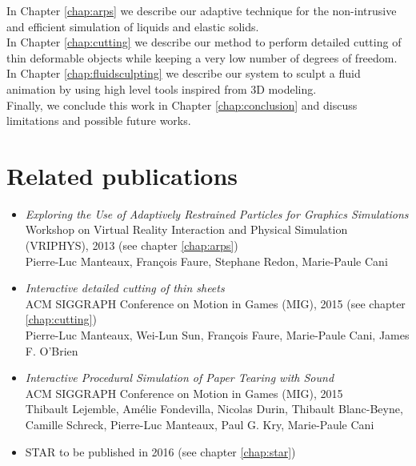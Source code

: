 In Chapter \ref{chap:arps} we describe our adaptive technique for the non-intrusive and efficient simulation of liquids and elastic solids. \\

In Chapter \ref{chap:cutting} we describe our method to perform detailed cutting of thin deformable objects while keeping a very low number of degrees of freedom.  \\

In Chapter \ref{chap:fluidsculpting} we describe our system to sculpt  a fluid animation by using high level tools inspired from 3D modeling. \\

Finally, we conclude this work in Chapter \ref{chap:conclusion} and discuss limitations and possible future works.

\section{Related publications}
\begin{itemize}
    \item \cite{Manteaux2013} \emph{Exploring the Use of Adaptively Restrained Particles for Graphics Simulations} \\
    Workshop on Virtual Reality Interaction and Physical Simulation (VRIPHYS), 2013 (see chapter \ref{chap:arps})\\
    Pierre-Luc Manteaux, François Faure, Stephane Redon, Marie-Paule Cani
    \item \cite{Manteaux2015} \emph{Interactive detailed cutting of thin sheets} \\
        ACM SIGGRAPH Conference on Motion in Games (MIG), 2015 (see chapter \ref{chap:cutting})\\
        Pierre-Luc Manteaux, Wei-Lun Sun, François Faure, Marie-Paule Cani, James F. O'Brien
            \item \cite{Lejemble2015} \emph{Interactive Procedural Simulation of Paper Tearing with Sound} \\
    ACM SIGGRAPH Conference on Motion in Games (MIG), 2015 \\
    Thibault Lejemble, Amélie Fondevilla, Nicolas Durin, Thibault Blanc-Beyne, Camille Schreck, Pierre-Luc Manteaux, Paul G. Kry, Marie-Paule Cani
	\item STAR to be published in 2016 (see chapter \ref{chap:star})
\end{itemize}

